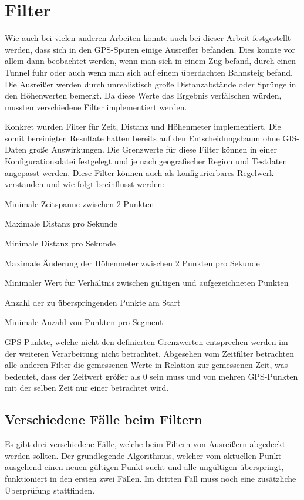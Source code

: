 \chapter{Filter}
Wie auch bei vielen anderen Arbeiten konnte auch bei dieser Arbeit festgestellt werden, dass sich in den GPS-Spuren einige Ausreißer befanden. Dies konnte vor allem dann beobachtet werden, wenn man sich in einem Zug befand, durch einen Tunnel fuhr oder auch wenn man sich auf einem überdachten Bahnsteig befand. Die Ausreißer werden durch unrealistisch große Distanzabstände oder Sprünge in den Höhenwerten bemerkt. Da diese Werte das Ergebnis verfälschen würden, mussten verschiedene Filter implementiert werden. 

Konkret wurden Filter für Zeit, Distanz und Höhenmeter implementiert. Die somit bereinigten Resultate hatten bereits auf den Entscheidungsbaum ohne GIS-Daten große Auswirkungen. Die Grenzwerte für diese Filter können in einer Konfigurationsdatei festgelegt und je nach geografischer Region und Testdaten angepasst werden. Diese Filter können auch als konfigurierbares Regelwerk verstanden und wie folgt beeinflusst werden:


\begin{pitemize}
\item Minimale Zeitspanne zwischen 2 Punkten
\item Maximale Distanz pro Sekunde
\item Minimale Distanz pro Sekunde
\item Maximale Änderung der Höhenmeter zwischen 2 Punkten pro Sekunde
\item Minimaler Wert für Verhältnis zwischen gültigen und aufgezeichneten Punkten
\item Anzahl der zu überspringenden Punkte am Start
\item Minimale Anzahl von Punkten pro Segment
\end{pitemize}

GPS-Punkte, welche nicht den definierten Grenzwerten entsprechen werden im der weiteren Verarbeitung nicht betrachtet. Abgesehen vom Zeitfilter betrachten alle anderen Filter die gemessenen Werte in Relation zur gemessenen Zeit, was bedeutet, dass der Zeitwert größer als 0 sein muss und von mehren GPS-Punkten mit der selben Zeit nur einer betrachtet wird.
\clearpage

\section{Verschiedene Fälle beim Filtern}
Es gibt drei verschiedene Fälle, welche beim Filtern von Ausreißern abgedeckt werden sollten. Der grundlegende Algorithmus, welcher vom aktuellen Punkt ausgehend einen neuen gültigen Punkt sucht und alle ungültigen überspringt, funktioniert in den ersten zwei Fällen. Im dritten Fall muss noch eine zusätzliche Überprüfung stattfinden.

